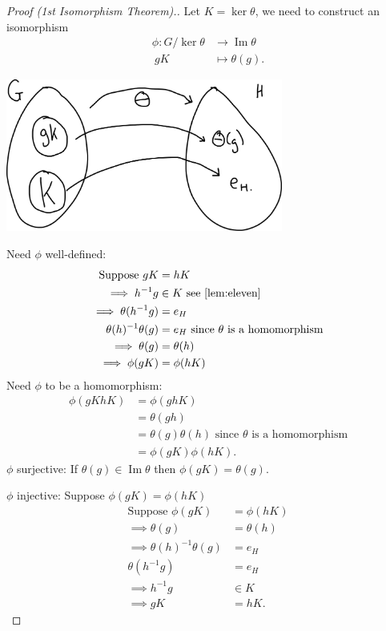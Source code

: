 \begin{proof}[Proof (1st Isomorphism Theorem).]
Let $K = \ker \theta$, we need to construct an isomorphism
\begin{align*}
    \phi : G / \ker \theta &\to \operatorname{Im} \theta \\
    \ gK &\mapsto \theta(g).
\end{align*}

{\centering \includegraphics[height=5cm]{figures/04-iso-thm}}

Need \(\phi\) well-defined:
\begin{align*}
    \text{Suppose } gK &= hK \\
    \implies h^{-1}g &\in K \text{ see \Cref{lem:eleven}} \\
    \implies \theta(h^{-1}g) &= e_H \\
    \theta(h)^{-1} \theta(g) &= e_H \text{ since $\theta$ is a homomorphism} \\
    \implies \theta(g) &= \theta(h) \\
    \implies \phi(gK) &= \phi(hK)
\end{align*}
%
Need \(\phi\) to be a homomorphism:
\begin{align*}
    \phi(gK hK) &= \phi(gh K) \\
    &= \theta(gh) \\
    &= \theta(g) \theta(h) \text{ since $\theta$ is a homomorphism} \\
    &= \phi(gK) \phi(hK).
\end{align*}
%
\(\phi\) surjective:
If \(\theta(g) \in \operatorname{Im} \theta\) then \(\phi(gK) = \theta(g)\).

\(\phi\) injective:
Suppose \(\phi(gK) = \phi(hK)\)
\begin{align*}
    \text{Suppose } \phi(gK) &= \phi(hK) \\
    \implies \theta(g) &= \theta(h) \\
    \implies \theta(h)^{-1} \theta(g) &= e_H \\
    \theta(h^{-1}g) &= e_H \\
    \implies h^{-1} g &\in K \\
    \implies gK &= hK. 
\end{align*}
\end{proof}

